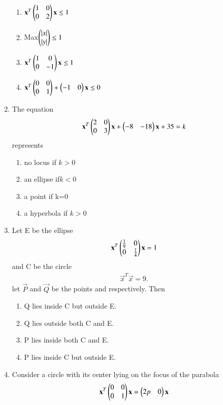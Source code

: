 \documentclass[journal,12pt,twocolumn]{IEEEtran}
\begin{document}
\begin{enumerate}[label=\arabic*]
    \begin{enumerate}
    \item $\mathbf {x}^T\begin{pmatrix}1&0 \\0 &2\end{pmatrix}\mathbf {x} \leq1$
    \item Max$\begin{pmatrix}\left\vert x\right\vert \\ \left\vert y\right\vert\end{pmatrix} \leq1$
    \item $\mathbf {x}^T \begin{pmatrix}1&0 \\0 &-1\end{pmatrix}\mathbf {x} \leq1$
    \item $\mathbf {x}^T \begin{pmatrix}0 &0 \\ 0& 1 \end{pmatrix} + \begin{pmatrix}-1& 0\end{pmatrix}\mathbf {x}\leq0$
    \end{enumerate}    
\item The equation 
\begin{align}
\mathbf{x}^T \begin{pmatrix}2&0 \\ 0& 3\end{pmatrix}\mathbf{x} + \begin{pmatrix}-8&-18\end{pmatrix}\mathbf{x}+35=k
\end{align} represents
    \begin{enumerate}
    \item no locus if $k>0$
    \item an ellipse if$k<0$
    \item a point if k=0
    \item a hyperbola if $k>0$
    \end{enumerate}
\item Let E be the ellipse 
\begin{align}
\mathbf {x}^T \begin{pmatrix}\frac{1}{9}&0 \\ 0&\frac{1}{4}\end{pmatrix}\mathbf {x}=1
\end{align} and C be the circle 
\begin{align}
\vec {x}^T \vec {x}=9.
\end{align} let $\vec{P}$ and $\vec{Q}$ be the points   and  respectively. Then
    \begin{enumerate}
    \item Q lies inside C but outside E.
    \item Q lies outside both C and E. 
    \item P lies inside both C and E. 
    \item P lies inside C but outside E.
    \end{enumerate}
\item Consider a circle with its center lying on the focus of the parabola 
	\begin{align}
	\vec {x}^T \myvec {0&0 \\ 0&1}\vec {x}=\myvec{2p&0}\vec{x}

\end{align}
\end{enumerate}
\end{document}
